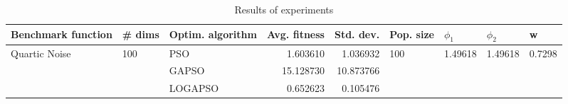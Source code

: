 \begin{table}
\centering
\caption{Results of experiments}
\begin{tabular}{lllrrllll}
\toprule
            Benchmark function &              \# dims & Optim. algorithm &  Avg. fitness &  Std. dev. &            Pop. size &               $\phi_{1}$ &               $\phi_{2}$ &                       w \\
\midrule
\multirow{3}{*}{Quartic Noise} & \multirow{3}{*}{100} &              PSO &      1.603610 &   1.036932 & \multirow{3}{*}{100} & \multirow{3}{*}{1.49618} & \multirow{3}{*}{1.49618} & \multirow{3}{*}{0.7298} \\
                               &                      &            GAPSO &     15.128730 &  10.873766 &                      &                          &                          &                         \\
                               &                      &          LOGAPSO &      0.652623 &   0.105476 &                      &                          &                          &                         \\
\bottomrule
\end{tabular}
\end{table}
